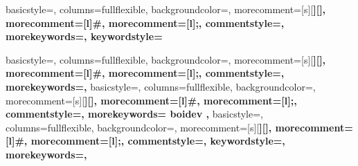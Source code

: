 
{
	basicstyle=\ttfamily\scriptsize,
	columns=fullflexible,
	backgroundcolor=\color{backcolour},
	morecomment=[s][\color{Orchid}\bfseries]{[}{]},
	morecomment=[l]{\#},
	morecomment=[l]{;},
	commentstyle=\color{gray}\ttfamily,
	morekeywords={},
	keywordstyle={\color{green}\bfseries}
}

{
	basicstyle=\color{blue}\ttfamily\footnotesize,
	columns=fullflexible,
	backgroundcolor=\color{backcolour},
	morecomment=[s][\color{Orchid}\bfseries]{[}{]},
	morecomment=[l]{\#},
	morecomment=[l]{;},
	commentstyle=\color{gray}\ttfamily,
	morekeywords={},
}
{
	basicstyle=\color{blue}\ttfamily\scriptsize,
	columns=fullflexible,
	backgroundcolor=\color{backcolour},
	morecomment=[s][\color{Orchid}\bfseries]{[}{]},
	morecomment=[l]{\#},
	morecomment=[l]{;},
	commentstyle=\color{gray}\ttfamily,
	morekeywords={
		boidev
		},
}
{
	basicstyle=\color{Black}\ttfamily\scriptsize,
	columns=fullflexible,
	backgroundcolor=\color{backcolour},
	morecomment=[s][\color{Violet}\bfseries]{[}{]},
	morecomment=[l]{\#},
	morecomment=[l]{;},
	commentstyle=\color{gray}\ttfamily,
	keywordstyle=\color{gray}\ttfamily,
	morekeywords={},
}

\lstset{style=myCustomMatlabStyle}
\lstset{framextopmargin=50pt}